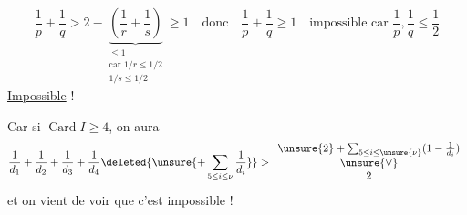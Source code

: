\[
\frac1p+\frac1q>2-\underbrace{\left(\frac1r+\frac1s\right)}_{\substack{\le1\\\text{car }1/r\le1/2\\1/s\le1/2}}\ge1
\quad\text{donc}\quad\frac1p+\frac1q\ge1\quad\text{impossible car }\frac1p,\frac1q\le\frac12
\]
\uline{Impossible} !

Car si $\operatorname{Card}I\ge4$, on aura
\[
\frac1{d_1}+\frac1{d_2}+\frac1{d_3}+\frac1{d_4}
\deleted{\unsure{+\sum_{5\le i\le\nu}\frac1{d_i}}}
>\begin{array}{c}\unsure{2}+\sum_{5\le i\le\unsure{\nu}}(1-\frac1{d_i})\\\unsure{\vee}\\2\end{array}
\]
et on vient de voir que c'est impossible !


